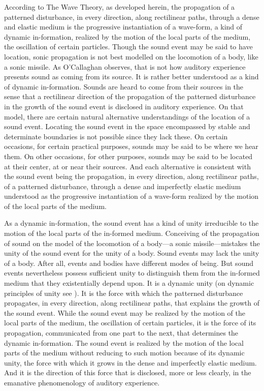 \documentclass[12pt]{article}
\begin{document}
According to The Wave Theory, as developed herein, the propagation of a patterned disturbance, in every direction, along rectilinear paths, through a dense and elastic medium is the progressive instantiation of a wave-form, a kind of dynamic in-formation, realized by the motion of the local parts of the medium, the oscillation of certain particles. Though the sound event may be said to have location, sonic propagation is not best modelled on the locomotion of a body, like a sonic missile. As O’Callaghan observes, that is not how auditory experience presents sound as coming from its source. It is rather better understood as a kind of dynamic in-formation. Sounds are heard to come from their sources in the sense that a rectilinear direction of the propagation of the patterned disturbance in the growth of the sound event is disclosed in auditory experience. On that model, there are certain natural alternative understandings of the location of a sound event. Locating the sound event in the space encompassed by stable and determinate boundaries is not possible since they lack these. On certain occasions, for certain practical purposes, sounds may be said to be where we hear them. On other occasions, for other purposes, sounds may be said to be located at their center, at or near their sources. And each alternative is consistent with the sound event being the propagation, in every direction, along rectilinear paths, of a patterned disturbance, through a dense and imperfectly elastic medium understood as the progressive instantiation of a wave-form realized by the motion of the local parts of the medium.

As a dynamic in-formation, the sound event has a kind of unity irreducible to the motion of the local parts of the in-formed medium. Conceiving of the propagation of sound on the model of the locomotion of a body---a sonic missile---mistakes the unity of the sound event for the unity of a body. Sound events may lack the unity of a body. After all, events and bodies have different modes of being. But sound events nevertheless possess sufficient unity to distinguish them from the in-formed medium that they existentially depend upon. It is a dynamic unity (on dynamic principles of unity see \citealt{Johnston:2006js}). It is the force with which the patterned disturbance propagates, in every direction, along rectilinear paths, that explains the growth of the sound event. While the sound event may be realized by the motion of the local parts of the medium, the oscillation of certain particles, it is the force of its propagation, communicated from one part to the next, that determines the dynamic in-formation. The sound event is realized by the motion of the local parts of the medium without reducing to such motion because of its dynamic unity, the force with which it grows in the dense and imperfectly elastic medium. And it is the direction of this force that is disclosed, more or less clearly, in the emanative phenomenology of auditory experience.
\end{document}
